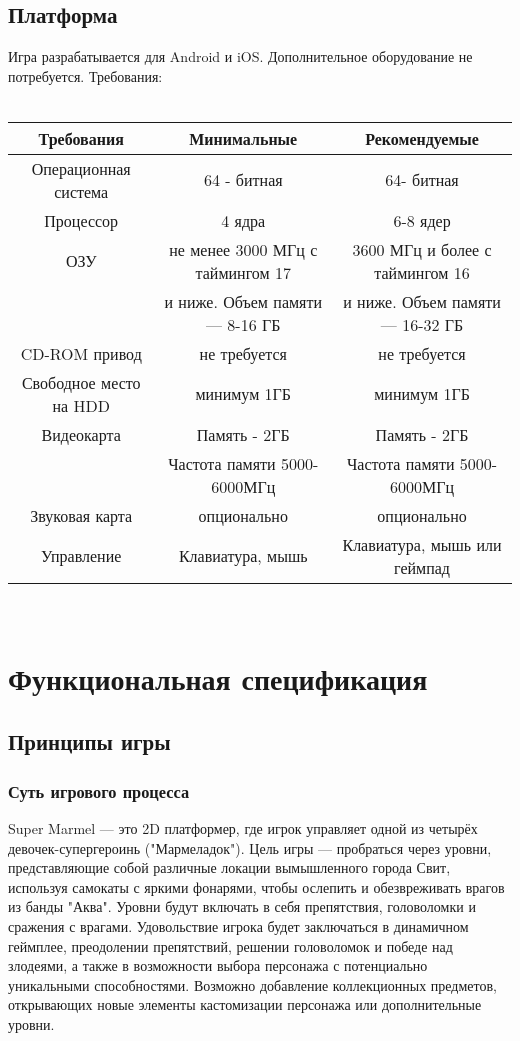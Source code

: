 \documentclass[article,12pt, fleqn]{article}
\begin{document}
\begin{itemize}
\subsection{Платформа}
Игра разрабатывается для Android и iOS. Дополнительное оборудование не потребуется.
Требования:\\[2mm]
\textcolor{white}{.}\hspace{-1cm}\begin{tabular}{|c|c|c|}
    \hline
    Требования & Минимальные & Рекомендуемые\\ \hline
    Операционная система & 64 - битная & 64- битная\\ \hline
    Процессор & 4 ядра & 6-8 ядер\\ \hline
    ОЗУ & не менее 3000 МГц с таймингом 17& 3600 МГц и более с таймингом 16\\
    & и ниже. Объем памяти — 8-16 ГБ &  и ниже. Объем памяти — 16-32 ГБ\\ \hline
    CD-ROM привод & не требуется & не требуется\\ \hline
    Свободное место на HDD &минимум 1ГБ  &минимум 1ГБ \\ \hline
    Видеокарта & Память - 2ГБ & Память - 2ГБ\\ 
    & Частота памяти 5000-6000МГц & Частота памяти 5000-6000МГц \\ \hline
    Звуковая карта &опционально& опционально \\ \hline
    Управление &Клавиатура, мышь & Клавиатура, мышь или геймпад\\ \hline
\end{tabular}\\[2mm]

\section{Функциональная спецификация}

\subsection{Принципы игры}

\subsubsection{Суть игрового процесса}
Super Marmel — это 2D платформер, где игрок управляет одной из четырёх девочек-супергероинь ("Мармеладок"). Цель игры — пробраться через уровни, представляющие собой различные локации вымышленного города Свит, используя самокаты с яркими фонарями, чтобы ослепить и обезвреживать врагов из банды "Аква". Уровни будут включать в себя препятствия, головоломки и сражения с врагами. Удовольствие игрока будет заключаться в динамичном геймплее, преодолении препятствий, решении головоломок и победе над злодеями, а также в возможности выбора персонажа с потенциально уникальными способностями. Возможно добавление коллекционных предметов, открывающих новые элементы кастомизации персонажа или дополнительные уровни.


\end{itemize}
\end{document}
